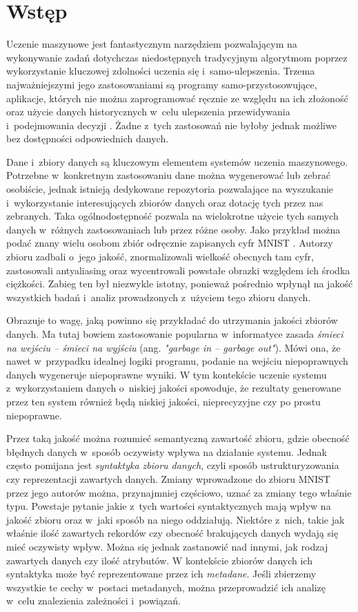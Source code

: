 \chapter*{Wstęp}
\label{ch:introduction}

Uczenie maszynowe jest fantastycznym narzędziem pozwalającym na wykonywanie zadań dotychczas niedostępnych tradycyjnym algorytmom poprzez wykorzystanie kluczowej zdolności uczenia się i~samo-ulepszenia.
Trzema najważniejszymi jego zastosowaniami są programy samo-przystosowujące, aplikacje, których nie można zaprogramować ręcznie ze względu na ich złożoność oraz użycie danych historycznych w~celu ulepszenia przewidywania i~podejmowania decyzji \cite{mitchell1997machine}.
Żadne z~tych zastosowań nie byłoby jednak możliwe bez dostępności odpowiednich danych.

Dane i~zbiory danych są kluczowym elementem systemów uczenia maszynowego.
Potrzebne w~konkretnym zastosowaniu dane można wygenerować lub zebrać osobiście, jednak istnieją dedykowane repozytoria pozwalające na wyszukanie i~wykorzystanie interesujących zbiorów danych oraz dotację tych przez nas zebranych.
Taka ogólnodostępność pozwala na wielokrotne użycie tych samych danych w~różnych zastosowaniach lub przez różne osoby.
Jako przykład można podać znany wielu osobom zbiór odręcznie zapisanych cyfr MNIST \cite{mnist}.
Autorzy zbioru zadbali o~jego jakość, znormalizowali wielkość obecnych tam cyfr, zastosowali antyaliasing oraz wycentrowali powstałe obrazki względem ich środka ciężkości.
Zabieg ten był niezwykle istotny, ponieważ pośrednio wpłynął na jakość wszystkich badań i~analiz prowadzonych z~użyciem tego zbioru danych.

Obrazuje to wagę, jaką powinno się przykładać do utrzymania jakości zbiorów danych.
Ma tutaj bowiem zastosowanie popularna w~informatyce zasada \textit{śmieci na wejściu -- śmieci na wyjściu} (ang. \textit{"garbage in -- garbage out"}).
Mówi ona, że nawet w~przypadku idealnej logiki programu, podanie na wejściu niepoprawnych danych wygeneruje niepoprawne wyniki.
W tym kontekście uczenie systemu z~wykorzystaniem danych o~niskiej jakości spowoduje, że rezultaty generowane przez ten system również będą niskiej jakości, nieprecyzyjne czy po prostu niepoprawne.

Przez taką jakość można rozumieć semantyczną zawartość zbioru, gdzie obecność błędnych danych w~sposób oczywisty wpływa na działanie systemu.
Jednak często pomijana jest \textit{syntaktyka zbioru danych}, czyli sposób ustrukturyzowania czy reprezentacji zawartych danych.
Zmiany wprowadzone do zbioru MNIST przez jego autorów można, przynajmniej częściowo, uznać za zmiany tego właśnie typu.
Powstaje pytanie jakie z~tych wartości syntaktycznych mają wpływ na jakość zbioru oraz w~jaki sposób na niego oddziałują.
Niektóre z~nich, takie jak właśnie ilość zawartych rekordów czy obecność brakujących danych wydają się mieć oczywisty wpływ.
Można się jednak zastanowić nad innymi, jak rodzaj zawartych danych czy ilość atrybutów.
W kontekście zbiorów danych ich syntaktyka może być reprezentowane przez ich \textit{metadane}.
Jeśli zbierzemy wszystkie te cechy w~postaci metadanych, można przeprowadzić ich analizę w~celu znalezienia zależności i~powiązań.

